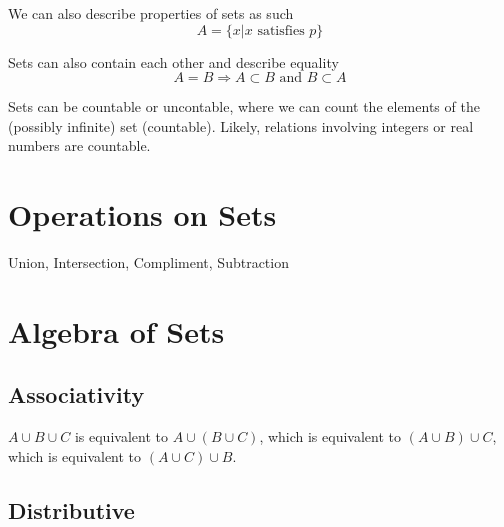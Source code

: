 \documentclass[12pt]{book}
\begin{document}
We can also describe properties of sets as such
$$A = \{ x | x \text{ satisfies } p\}$$

Sets can also contain each other and describe equality
$$A = B \Rightarrow A \subset B \text{ and } B \subset A$$

Sets can be countable or uncontable, where we can count the elements
of the (possibly infinite) set (countable). Likely, relations
involving integers or real numbers are countable.

\section{Operations on Sets}
Union, Intersection, Compliment, Subtraction

\section{Algebra of Sets}
\subsection{Associativity}
$A \cup B \cup C$ is equivalent to $A \cup (B \cup C)$, which is
equivalent to $(A \cup B) \cup C$, which is equivalent to $(A \cup C)
\cup B$.
\subsection{Distributive}


\printglossaries
\end{document}
